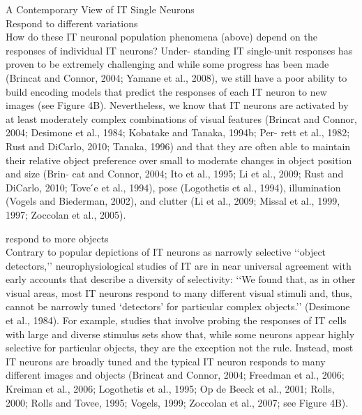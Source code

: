 A Contemporary View of IT Single Neurons\\
Respond to different variations\\
How do these IT neuronal population phenomena (above)
depend on the responses of individual IT neurons? Under-
standing IT single-unit responses has proven to be extremely
challenging and while some progress has been made (Brincat
and Connor, 2004; Yamane et al., 2008), we still have a poor
ability to build encoding models that predict the responses of
each IT neuron to new images (see Figure 4B). Nevertheless,
we know that IT neurons are activated by at least moderately
complex combinations of visual features (Brincat and Connor,
2004; Desimone et al., 1984; Kobatake and Tanaka, 1994b; Per-
rett et al., 1982; Rust and DiCarlo, 2010; Tanaka, 1996) and that
they are often able to maintain their relative object preference
over small to moderate changes in object position and size (Brin-
cat and Connor, 2004; Ito et al., 1995; Li et al., 2009; Rust and
DiCarlo, 2010; Tove ́e et al., 1994), pose (Logothetis et al.,
1994), illumination (Vogels and Biederman, 2002), and clutter
(Li et al., 2009; Missal et al., 1999, 1997; Zoccolan et al., 2005).

respond to more objects\\
Contrary to popular depictions of IT neurons as narrowly
selective ‘‘object detectors,’’ neurophysiological studies of IT
are in near universal agreement with early accounts that describe
a diversity of selectivity: ‘‘We found that, as in other visual areas, most IT neurons respond to many different visual stimuli and,
thus, cannot be narrowly tuned ‘detectors’ for particular
complex objects.’’ (Desimone et al., 1984). For example,
studies that involve probing the responses of IT cells with large
and diverse stimulus sets show that, while some neurons appear
highly selective for particular objects, they are the exception not
the rule. Instead, most IT neurons are broadly tuned and the
typical IT neuron responds to many different images and objects
(Brincat and Connor, 2004; Freedman et al., 2006; Kreiman et al.,
2006; Logothetis et al., 1995; Op de Beeck et al., 2001; Rolls,
2000; Rolls and Tovee, 1995; Vogels, 1999; Zoccolan et al.,
2007; see Figure 4B).

